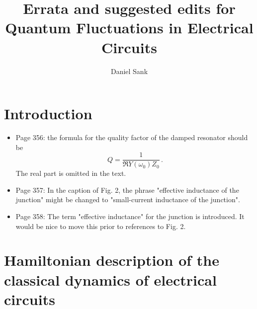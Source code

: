\documentclass{article}
\title{Errata and suggested edits for \\
Quantum Fluctuations in Electrical Circuits}
\author{Daniel Sank}
\begin{document}
\maketitle

\section{Introduction}

\begin{itemize}

\item Page 356: the formula for the quality factor of the damped resonator should be
\begin{equation}
Q = \frac{1}{\Re{Y(\omega_0)} Z_0} \nonumber \, .
\end{equation} 
The real part is omitted in the text.

\item Page 357: In the caption of Fig. 2, the phrase "effective inductance of the junction" might be changed to "small-current inductance of the junction".

\item Page 358: The term "effective inductance" for the junction is introduced. It would be nice to move this prior to references to Fig. 2.

\end{itemize}


\section{Hamiltonian description of the classical dynamics of electrical circuits}
\end{document}
